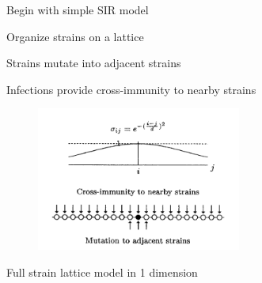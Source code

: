 \documentclass{beamer}
\begin{document}
\begin{frame}{Begin with simple SIR model}
    
    \begin{figure}
        \centering
        \scalebox{0.8}{
        
        }
    \end{figure}
\end{frame}
\begin{frame}{Organize strains on a lattice}
    \begin{figure}
        \centering
        \scalebox{0.8}{
        
        }
    \end{figure}
\end{frame}
\begin{frame}{Strains mutate into adjacent strains}
    \begin{figure}
        \centering
        \scalebox{0.8}{
        
        }
    \end{figure}
\end{frame}
\begin{frame}{Infections provide cross-immunity to nearby strains}
        \centering
            \begin{figure}
                \includegraphics[width=0.6\textwidth]{standalone/gog_fig.png}
            \end{figure}
    \centering
    \vfill
    \tiny{\cite{gogDynamicsSelectionManystrain2002}}
\end{frame}
\begin{frame}{Full strain lattice model in 1 dimension}
    \begin{figure}
        \centering
        \scalebox{0.8}{
        
        }
    \end{figure}
\end{frame}
\end{document}
